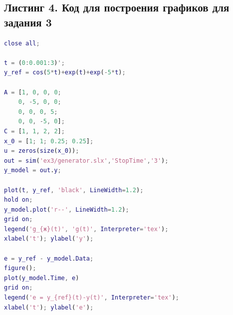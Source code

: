 \documentclass[a4paper]{article}
\begin{document}
\subsection*{Листинг 4. Код для построения графиков для задания 3}

\begin{lstlisting}[caption={Код для построения графиков для задания 2}, language=matlab]
close all;

t = (0:0.001:3)';
y_ref = cos(5*t)+exp(t)+exp(-5*t);

A = [1, 0, 0, 0;
    0, -5, 0, 0;
    0, 0, 0, 5;
    0, 0, -5, 0];
C = [1, 1, 2, 2];
x_0 = [1; 1; 0.25; 0.25];
u = zeros(size(x_0));
out = sim('ex3/generator.slx','StopTime','3');
y_model = out.y;

plot(t, y_ref, 'black', LineWidth=1.2);
hold on;
y_model.plot('r--', LineWidth=1.2);
grid on;
legend('g_{ж}(t)', 'g(t)', Interpreter='tex');
xlabel('t'); ylabel('y');

e = y_ref - y_model.Data;
figure();
plot(y_model.Time, e)
grid on;
legend('e = y_{ref}(t)-y(t)', Interpreter='tex');
xlabel('t'); ylabel('e');
\end{lstlisting}
\end{document}
